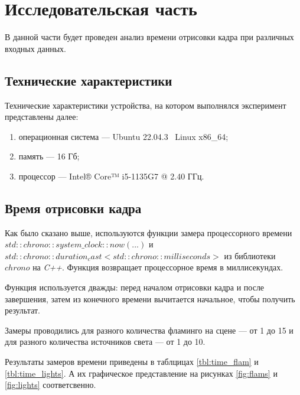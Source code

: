 \chapter{Исследовательская часть}

В данной части будет проведен анализ времени отрисовки кадра при различных входных данных.

\section{Технические характеристики}

Технические характеристики устройства, на котором выполнялся эксперимент представлены далее:

\begin{enumerate}[label=\arabic*)]
	\item операционная система --- Ubuntu 22.04.3~\cite{ubuntu} Linux x86\_64;
	\item память --- 16 Гб;
	\item процессор --- Intel® Core™ i5-1135G7 @ 2.40 ГГц.
\end{enumerate}

\section{Время отрисовки кадра}

Как было сказано выше, используются функции замера процессорного времени \textit{$std::chrono::system\_clock::now(...)$} и \textit{$std::chrono::duration_cast<std::chrono::milliseconds>$} из библиотеки $chrono$ на \textit{C++}. Функция возвращает процессорное время в миллисекундах.

Функция используется дважды: перед началом отрисовки кадра и после завершения, затем из конечного времени вычитается начальное, чтобы получить результат.

Замеры проводились для разного количества фламинго на сцене --- от 1 до 15 и для разного количества источников света --- от 1 до 10.

Результаты замеров времени приведены в таблцицах \ref{tbl:time_flam} и \ref{tbl:time_lights}. А их графическое представление на рисунках \ref{fig:flams} и \ref{fig:lights} соответсвенно.

